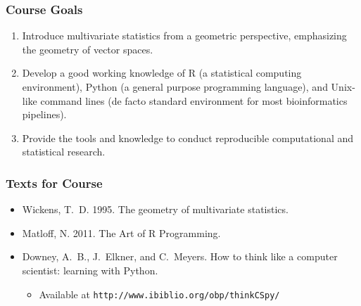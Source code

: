 \documentclass{beamer}
\begin{document}
\begin{frame}
  \frametitle{Course Goals}

\begin{enumerate}

\item Introduce multivariate statistics from a geometric perspective, emphasizing the geometry of vector spaces.

\item Develop a good working knowledge of R (a statistical computing environment), Python (a general purpose programming language), and Unix-like command lines (de facto standard environment for most bioinformatics pipelines).

\item Provide the tools and knowledge to conduct reproducible computational and statistical research.


\end{enumerate}

\end{frame}




\begin{frame}
  \frametitle{Texts for Course}

\begin{itemize}

\item Wickens, T.\ D. 1995. The geometry of multivariate statistics.

\item Matloff, N. 2011. The Art of R Programming.

\item Downey, A.\ B., J.\ Elkner, and C.\ Meyers. How to think like a computer scientist: learning with Python.
\begin{itemize}
	\item Available at \texttt{http://www.ibiblio.org/obp/thinkCSpy/}
\end{itemize}


\end{itemize}

\end{frame}
\end{document}
